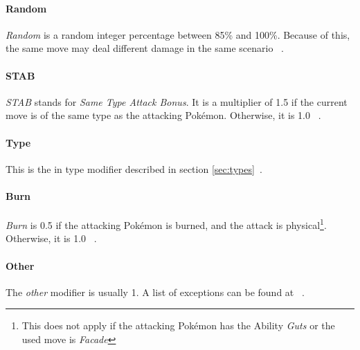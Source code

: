 \paragraph{Random}
\textit{Random} is a random integer percentage between 85\% and 100\%. Because of this, the same move
may deal different damage in the same scenario ~\autocite{Bulbapedia:Damage}.

\paragraph{STAB}
\textit{STAB} stands for \textit{Same Type Attack Bonus}. It is a multiplier of 1.5 if the current move
is of the same type as the attacking Pokémon. Otherwise, it is 1.0 ~\autocite{Bulbapedia:Damage}.

\paragraph{Type}
This is the in type modifier described in section \ref{sec:types}~\autocite{Bulbapedia:Damage}.

\paragraph{Burn}
\textit{Burn} is 0.5 if the attacking Pokémon is burned, and the attack
is physical\footnote{This does not apply if the attacking Pokémon has the Ability \textit{Guts}
or the used move is \textit{Facade}}. Otherwise, it is 1.0 ~\autocite{Bulbapedia:Damage}.

\paragraph{Other}
The \textit{other} modifier is usually 1. A list of exceptions can be found at ~\autocite{Bulbapedia:Damage}.

